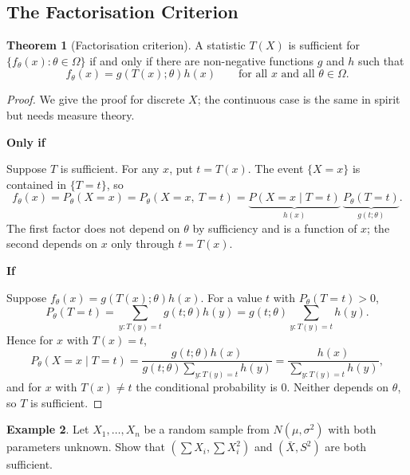 \documentclass[12pt,a4paper]{report}
\theoremstyle{definition}
\newtheorem{thm}{Theorem}[section]
\newtheorem{exa}[thm]{Example}
\newcommand{\subhead}[1]{%
  \par\medskip\noindent\textbf{#1}\par\nobreak\smallskip}
\begin{document}
\subsection{The Factorisation Criterion}

\begin{thm}[Factorisation criterion]
\label{thm:factorisation}
A statistic $T(X)$ is sufficient for $\{f_\theta(x) : \theta\in\Omega\}$ if and
only if there are non-negative functions $g$ and $h$ such that
\[f_\theta(x) = g\left(T(x); \theta\right) h(x)\qquad\text{for all } x \text{ and all } \theta\in\Omega .\]
\end{thm}

\begin{proof}
We give the proof for discrete $X$; the continuous case is the same in spirit but
needs measure theory.

\subhead{Only if}
Suppose $T$ is sufficient. For any $x$, put $t = T(x)$. The event $\{X = x\}$ is
contained in $\{T = t\}$, so
\[f_\theta(x) = P_\theta(X = x) = P_\theta(X = x,\ T = t)
= \underbrace{P(X = x\mid T = t)}_{h(x)}\ \underbrace{P_\theta(T = t)}_{g(t;\theta)} .\]
The first factor does not depend on $\theta$ by sufficiency and is a function of
$x$; the second depends on $x$ only through $t = T(x)$.

\subhead{If}
Suppose $f_\theta(x) = g(T(x);\theta)h(x)$. For a value $t$ with
$P_\theta(T = t)>0$,
\[P_\theta(T = t) = \sum_{y : T(y) = t} g(t;\theta)h(y) = g(t;\theta)\sum_{y : T(y) = t} h(y) .\]
Hence for $x$ with $T(x) = t$,
\[P_\theta(X = x\mid T = t) = \frac{g(t;\theta)h(x)}{g(t;\theta)\sum_{y : T(y) = t} h(y)}
= \frac{h(x)}{\sum_{y : T(y) = t} h(y)},\]
and for $x$ with $T(x)\ne t$ the conditional probability is $0$. Neither depends on
$\theta$, so $T$ is sufficient.
\end{proof}

\begin{exa}
\label{ex:normalfactor}
Let $X_1, \dots, X_n$ be a random sample from $N(\mu, \sigma^2)$ with both
parameters unknown. Show that $\left(\sum X_i, \sum X_i^2\right)$ and
$(\bar X, S^2)$ are both sufficient.
\end{exa}
\end{document}
